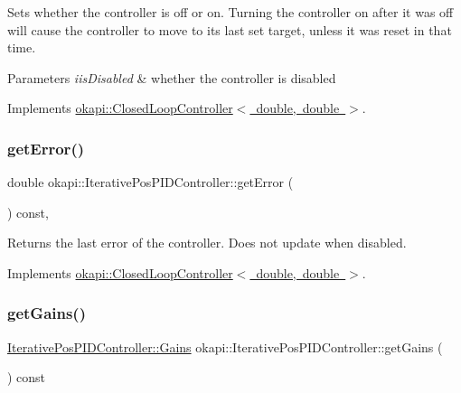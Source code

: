Sets whether the controller is off or on. Turning the controller on after it was off will cause the controller to move to its last set target, unless it was reset in that time.


\begin{DoxyParams}{Parameters}
{\em iis\+Disabled} & whether the controller is disabled \\
\hline
\end{DoxyParams}


Implements \mbox{\hyperlink{classokapi_1_1ClosedLoopController_a768cd1db40ce9cd5c89b20be6e838ccc}{okapi\+::\+Closed\+Loop\+Controller$<$ double, double $>$}}.

\mbox{\label{classokapi_1_1IterativePosPIDController_a632611340113011f75c7ee1c389231e3}} 
\subsubsection{\texorpdfstring{getError()}{getError()}}
{\footnotesize\ttfamily double okapi\+::\+Iterative\+Pos\+P\+I\+D\+Controller\+::get\+Error (\begin{DoxyParamCaption}{ }\end{DoxyParamCaption}) const\hspace{0.3cm}{\ttfamily [override]}, {\ttfamily [virtual]}}

Returns the last error of the controller. Does not update when disabled. 

Implements \mbox{\hyperlink{classokapi_1_1ClosedLoopController_a50c73444ff6e3e631951c43d0f951953}{okapi\+::\+Closed\+Loop\+Controller$<$ double, double $>$}}.

\mbox{\label{classokapi_1_1IterativePosPIDController_ad441fc988ded8fc2599b2c719fbcabe7}} 
\subsubsection{\texorpdfstring{getGains()}{getGains()}}
{\footnotesize\ttfamily \mbox{\hyperlink{structokapi_1_1IterativePosPIDController_1_1Gains}{Iterative\+Pos\+P\+I\+D\+Controller\+::\+Gains}} okapi\+::\+Iterative\+Pos\+P\+I\+D\+Controller\+::get\+Gains (\begin{DoxyParamCaption}{ }\end{DoxyParamCaption}) const}

